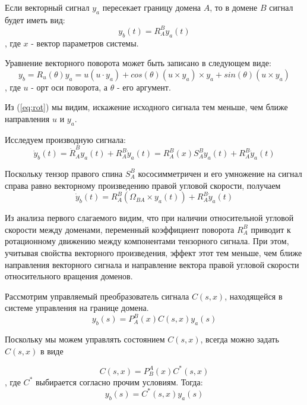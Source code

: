 \documentclass[a4paper]{article}
\begin{document}
Если векторный сигнал $y_a$ пересекает границу домена $A$, то в домене $B$ сигнал будет иметь вид:
\begin{equation} y_b(t) = R_A^B y_a(t) \end{equation},
где $x$ - вектор параметров системы.  

Уравнение векторного поворота может быть записано в следующем виде:
\begin{equation} \label{eq:rot}
y_b = R_u(\theta)y_a = u(u \cdot y_a) + cos(\theta)(u \times y_a) \times y_a + sin(\theta)(u \times y_a)
\end{equation}
, где $u$ - орт оси поворота, а $\theta$ - его аргумент.

Из (\ref{eq:rot}) мы видим, искажение исходного сигнала тем меньше, чем ближе направления $u$ и $y_a$.

Исследуем производную сигнала:
\begin{equation} \dot{y}_b(t) = \dot{R}_A^B y_a(t) + R_A^B \dot{y}_a(t) = 
R_A^B(x) S_A^B y_a(t) + R_A^B \dot{y}_a(t) \end{equation}

Поскольку тензор правого спина $S_A^B$ кососимметричен и его умножение на сигнал справа равно векторному произведению правой угловой скорости, получаем
\begin{equation} \dot{y}_b(t) = R_A^B (\Omega_{BA} \times y_a(t)) + R_A^B \dot{y}_a(t)\end{equation}

Из анализа первого слагаемого видим, что при наличии относительной угловой скорости между доменами, переменный коэффициент поворота $R_A^B$ приводит к ротационному движению между компонентами тензорного сигнала. При этом, учитывая свойства векторного произведения, эффект этот тем меньше, чем ближе направления векторного сигнала и направление вектора правой угловой скорости относительного вращения доменов.  

Рассмотрим управляемый преобразователь сигнала $C(s,x)$, находящейся в системе управления на границе домена.
\begin{equation} y_b(s) = P_A^B(x) C(s,x) y_a(s) \end{equation}

Поскольку мы можем управлять состоянием $C(s,x)$, всегда можно задать $C(s,x)$ в виде

\begin{equation} C(s,x) = P_B^A(x) C^*(s,x) \end{equation}
, где $C^*$ выбирается согласно прочим условиям. Тогда:
\begin{equation} y_b(s) = C^*(s,x) y_a(s) \end{equation} 
\end{document}

